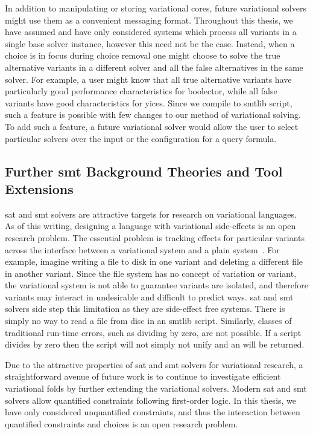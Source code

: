 In addition to manipulating or storing variational cores, future variational
solvers might use them as a convenient messaging format. Throughout this thesis,
we have assumed and have only considered systems which process all variants in a
single base solver instance, however this need not be the case. Instead, when a
choice is in focus during choice removal one might choose to solve the true
alternative variants in a different solver and all the false alternatives in the
same solver. For example, a user might know that all true alternative variants
have particularly good performance characteristics for boolector, while all
false variants have good characteristics for yices. Since we compile to
\acl{smtlib} script, such a feature is possible with few changes to our method
of variational solving. To add such a feature, a future variational solver would
allow the user to select particular solvers over the input \vc{} or the
configuration for a query formula.

\subsection{Further \ac{smt} Background Theories and Tool Extensions}
\ac{sat} and \ac{smt} solvers are attractive targets for research on variational
languages. As of this writing, designing a language with variational
side-effects is an open research problem. The essential problem is tracking
effects for particular variants across the interface between a variational
system and a plain system~\cite{ghadeerThesis}. For example, imagine writing a
file to disk in one variant and deleting a different file in another variant.
Since the file system has no concept of variation or variant, the variational
system is not able to guarantee variants are isolated, and therefore variants
may interact in undesirable and difficult to predict ways. \ac{sat} and \ac{smt}
solvers side step this limitation as they are side-effect free systems. There is
simply no way to read a file from disc in an \acl{smtlib} script. Similarly,
classes of traditional run-time errors, such as dividing by zero, are not
possible. If a script divides by zero then the script will not simply not unify
and an  will be returned.

Due to the attractive properties of \ac{sat} and \ac{smt} solvers for
variational research, a straightforward avenue of future work is to continue to
investigate efficient variational folds by further extending the variational
solvers. Modern \ac{sat} and \ac{smt} solvers allow quantified constraints
following first-order logic. In this thesis, we have only considered
unquantified constraints, and thus the interaction between quantified
constraints and choices is an open research problem.

